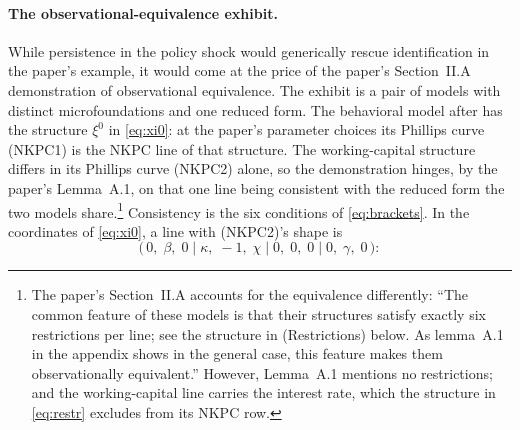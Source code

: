 \documentclass[11pt]{article}
\theoremstyle{remark}
\begin{document}
\paragraph{The observational-equivalence exhibit.}
While persistence in the policy shock would generically rescue identification in the paper's example, it would come at the price of the paper's Section~II.A demonstration of observational equivalence. The exhibit is a pair of models with distinct microfoundations and one reduced form. The behavioral model after \citet{Gabaix2020} has the structure $\xi^0$ in \eqref{eq:xi0}: at the paper's parameter choices its Phillips curve (NKPC1) is the NKPC line of that structure. The working-capital structure differs in its Phillips curve (NKPC2) alone, so the demonstration hinges, by the paper's Lemma~A.1, on that one line being consistent with the reduced form the two models share.\footnote{The paper's Section~II.A accounts for the equivalence differently: ``The common feature of these models is that their structures satisfy exactly six restrictions per line; see the structure in (Restrictions) below. As lemma~A.1 in the appendix shows in the general case, this feature makes them observationally equivalent.'' However, Lemma~A.1 mentions no restrictions; and the working-capital line carries the interest rate, which the structure in \eqref{eq:restr} excludes from its NKPC row.} Consistency is the six conditions of \eqref{eq:brackets}. In the coordinates of \eqref{eq:xi0}, a line with (NKPC2)'s shape is
\begin{equation*}
\bigl(\,0,\;\beta,\;0\;\big|\;\kappa,\;-1,\;\chi\;\big|\; 0,\;0,\;0\;\big|\;0,\;\gamma,\;0\,\bigr):
\end{equation*}
\end{document}

